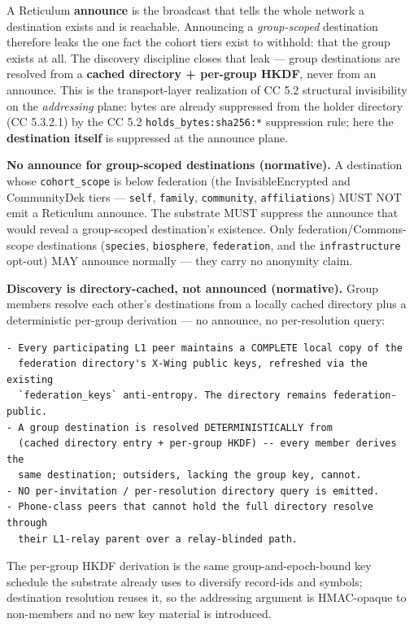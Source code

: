 \documentclass[11pt]{article}
\begin{document}
A Reticulum \textbf{announce} is the broadcast that tells the whole network a destination exists and is reachable. Announcing a \textit{group-scoped} destination therefore leaks the one fact the cohort tiers exist to withhold: that the group exists at all. The discovery discipline closes that leak — group destinations are resolved from a \textbf{cached directory + per-group HKDF}, never from an announce. This is the transport-layer realization of CC 5.2 structural invisibility on the \textit{addressing} plane: bytes are already suppressed from the holder directory (CC 5.3.2.1) by the CC 5.2 \texttt{holds\_bytes:sha256:*} suppression rule; here the \textbf{destination itself} is suppressed at the announce plane.


\textbf{No announce for group-scoped destinations (normative).} A destination whose \texttt{cohort\_scope} is below federation (the InvisibleEncrypted and CommunityDek tiers — \texttt{self}, \texttt{family}, \texttt{community}, \texttt{affiliations}) MUST NOT emit a Reticulum announce. The substrate MUST suppress the announce that would reveal a group-scoped destination's existence. Only federation/Commons-scope destinations (\texttt{species}, \texttt{biosphere}, \texttt{federation}, and the \texttt{infrastructure} opt-out) MAY announce normally — they carry no anonymity claim.


\textbf{Discovery is directory-cached, not announced (normative).} Group members resolve each other's destinations from a locally cached directory plus a deterministic per-group derivation — no announce, no per-resolution query:


\begin{lstlisting}
- Every participating L1 peer maintains a COMPLETE local copy of the
  federation directory's X-Wing public keys, refreshed via the existing
  `federation_keys` anti-entropy. The directory remains federation-public.
- A group destination is resolved DETERMINISTICALLY from
  (cached directory entry + per-group HKDF) -- every member derives the
  same destination; outsiders, lacking the group key, cannot.
- NO per-invitation / per-resolution directory query is emitted.
- Phone-class peers that cannot hold the full directory resolve through
  their L1-relay parent over a relay-blinded path.
\end{lstlisting}

The per-group HKDF derivation is the same group-and-epoch-bound key schedule the substrate already uses to diversify record-ids and symbols; destination resolution reuses it, so the addressing argument is HMAC-opaque to non-members and no new key material is introduced.
\end{document}
